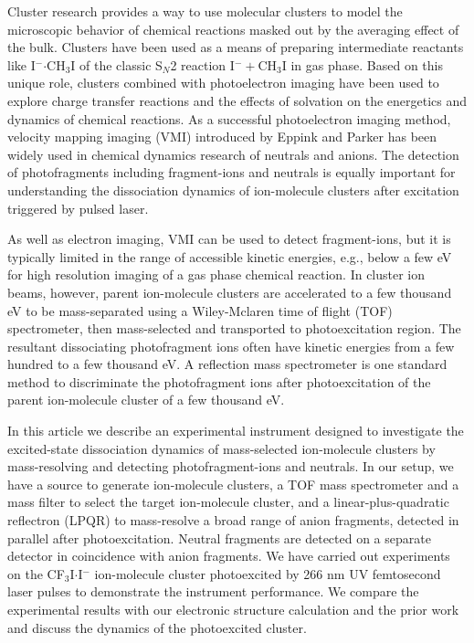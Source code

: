 \documentclass[%
aip,
rsi,
 amsmath,amssymb,
reprint,%
]{revtex4-1}
\begin{document}
Cluster research provides a way to use molecular clusters to model the microscopic behavior of chemical reactions masked out by the averaging effect of the bulk\cite{castleman_ionic_1986}. Clusters have been used as a means of preparing intermediate reactants like I$^-$$\cdot$CH$_3$I of the classic S$_N$2 reaction I$^-+$CH$_3$I in gas phase\cite{cyr_observation_1992}. Based on this unique role, clusters combined with photoelectron imaging have been used to explore charge transfer reactions\cite{cyr_observation_1992,cyr_photoelectron_1993,cyr_charge_1994,dessent_dipolebound_1995,dessent_observation_1995,dessent_vibrational_1996} and the effects of solvation on the energetics and dynamics of chemical reactions\cite{mabbs_photoelectron_2005}. As a successful photoelectron imaging method\cite{doi:10.1146/annurev.pc.46.100195.002003}, velocity mapping imaging (VMI) introduced by Eppink and Parker\cite{eppink_velocity_1997} has been widely used in chemical dynamics research of neutrals and anions\cite{stolow_femtosecond_2004,surber_probing_2003}. The detection of photofragments including fragment-ions and neutrals is equally important for understanding the dissociation dynamics of ion-molecule clusters after excitation triggered by pulsed laser\cite{dessent_vibrational_1996}.

As well as electron imaging, VMI can be used to detect fragment-ions, but it is typically limited in the range of accessible kinetic energies, e.g., below a few eV for high resolution imaging of a gas phase chemical reaction\cite{doi:10.1146/annurev.pc.46.100195.002003,mikosch_imaging_2008,wester_velocity_2013}. In cluster ion beams, however, parent ion-molecule clusters are accelerated to a few thousand eV to be mass-separated using a Wiley-Mclaren time of flight (TOF) spectrometer\cite{wiley_timeflight_1955}, then mass-selected and transported to photoexcitation region\cite{alexander_recombination_1988}. The resultant dissociating photofragment ions often have kinetic energies from a few hundred to a few thousand eV. A reflection mass spectrometer\cite{alexander_recombination_1988,oh_tandem_2004} is one standard method to discriminate the photofragment ions after photoexcitation of the parent ion-molecule cluster of a few thousand eV. 

In this article we describe an experimental instrument designed to investigate the excited-state dissociation dynamics of mass-selected ion-molecule clusters by mass-resolving and detecting photofragment-ions and neutrals. In our setup, we have a source to generate ion-molecule clusters, a TOF mass spectrometer and a mass filter to select the target ion-molecule cluster, and a linear-plus-quadratic reflectron\cite{oh_tandem_2004} (LPQR) to mass-resolve a broad range of anion fragments, detected in parallel after photoexcitation. Neutral fragments are detected on a separate detector in coincidence with anion fragments. We have carried out experiments on the CF$_3$I$\cdot$I$^-$ ion-molecule cluster photoexcited by 266 nm UV femtosecond laser pulses to demonstrate the instrument performance. We compare the experimental results with our electronic structure calculation and the prior work and discuss the dynamics of the photoexcited cluster.
\end{document}
